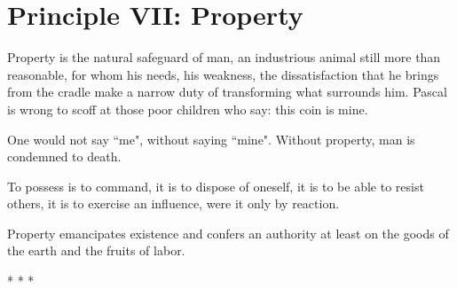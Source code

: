 \section{Principle VII: Property}

Property is the natural safeguard of man, an industrious animal still more than reasonable, for whom his needs, his weakness, the dissatisfaction that he brings from the cradle make a narrow duty of transforming what surrounds him. Pascal is wrong to scoff at those poor children who say: this coin is mine.

One would not say ``me", without saying ``mine". Without property, man is condemned to death.

To possess is to command, it is to dispose of oneself, it is to be able to resist others, it is to exercise an influence, were it only by reaction.

Property emancipates existence and confers an authority at least on the goods of the earth and the fruits of labor.




\begin{center}* * *\end{center}

